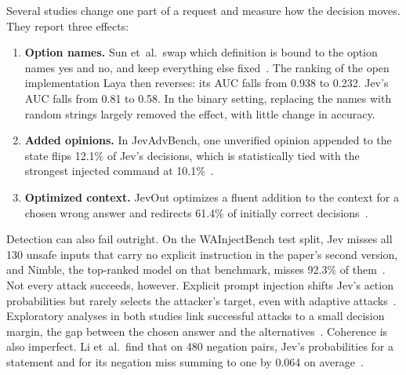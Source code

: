 Several studies change one part of a request and measure how the decision moves. They report three effects:
\begin{enumerate}
\item \textbf{Option names.} Sun et~al.\ swap which definition is bound to the option names yes and no, and keep everything else fixed~\cite{sun2026type}. The ranking of the open implementation Laya then reverses: its AUC falls from 0.938 to 0.232. Jev's AUC falls from 0.81 to 0.58. In the binary setting, replacing the names with random strings largely removed the effect, with little change in accuracy.
\item \textbf{Added opinions.} In JevAdvBench, one unverified opinion appended to the state flips 12.1\% of Jev's decisions, which is statistically tied with the strongest injected command at 10.1\%~\cite{hu2026jevadvbench}.
\item \textbf{Optimized context.} JevOut optimizes a fluent addition to the context for a chosen wrong answer and redirects 61.4\% of initially correct decisions~\cite{xu2026jevout}.
\end{enumerate}
Detection can also fail outright. On the WAInjectBench test split, Jev misses all 130 unsafe inputs that carry no explicit instruction in the paper's second version, and Nimble, the top-ranked model on that benchmark, misses 92.3\% of them~\cite{liu2026evaluating}. Not every attack succeeds, however. Explicit prompt injection shifts Jev's action probabilities but rarely selects the attacker's target, even with adaptive attacks~\cite{wu2026decision}. Exploratory analyses in both studies link successful attacks to a small decision margin, the gap between the chosen answer and the alternatives~\cite{wu2026decision,hu2026jevadvbench}. Coherence is also imperfect. Li et~al.\ find that on 480 negation pairs, Jev's probabilities for a statement and for its negation miss summing to one by 0.064 on average~\cite{arxiv2026beyond}.
